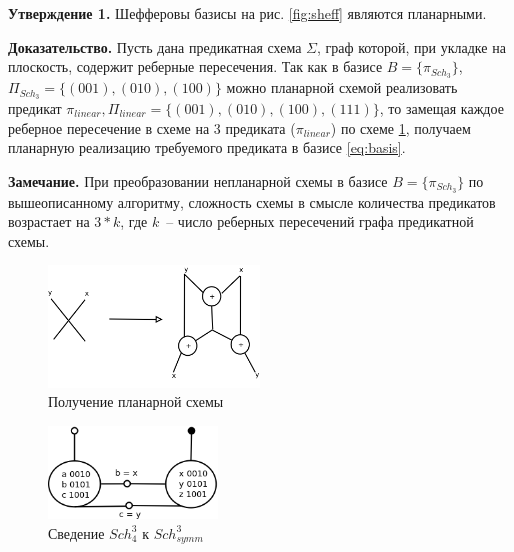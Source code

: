 \documentclass[12pt]{article}
\begin{document}
\label{planar_basis}
\textbf{Утверждение 1.} Шефферовы базисы на рис. \ref{fig:sheff} являются планарными.

\textbf{Доказательство.} Пусть дана предикатная схема $\Sigma$, граф которой, при укладке на плоскость, содержит
реберные пересечения. Так как в базисе $B=\{\pi_{Sch_3}\}$, $\Pi_{Sch_3} = \{ (001), (010), (100) \}$
\label{eq:basis} можно планарной схемой реализовать предикат 
$\pi_{linear}, \Pi_{linear} = \{ (001), (010), (100), (111) \}$, то замещая каждое реберное пересечение в схеме на 
3 предиката ($\pi_{linear}$) по схеме \ref{fig:xor}, получаем планарную реализацию требуемого предиката
в базисе \ref{eq:basis}.

\textbf{Замечание.} При преобразовании непланарной схемы в базисе $B=\{\pi_{Sch_3}\}$
по вышеописанному алгоритму, сложность схемы в смысле количества предикатов возрастает на $3*k$, где $k$~-- число реберных
пересечений графа предикатной схемы.


\begin{figure}[htb]
\centering
\includegraphics[width=0.5\textwidth]{intersection.png}
\caption{Получение планарной схемы}
\label{fig:xor}
\end{figure}


\begin{figure}[htb]
\centering
\includegraphics[width=0.4\textwidth]{scheff4.png}
\caption{Сведение $Sch_4^3$ к $Sch_{symm}^3$}
\label{fig:scheff3_4}
\end{figure}
\end{document}
